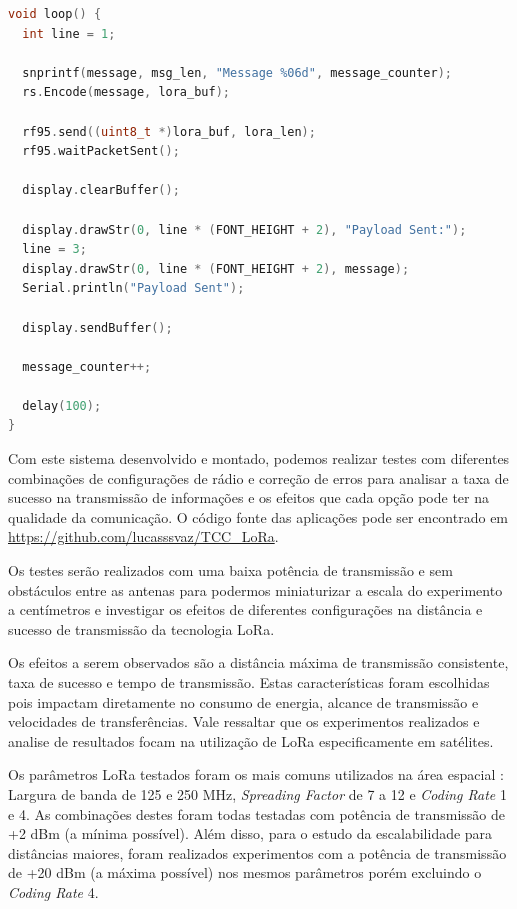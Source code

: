 \documentclass[
	12pt,				%
	openright,			%
	twoside,			%
	a4paper,			%
	english,			%
	french,				%
	spanish,			%
	brazil				%
	]{abntex2}
\begin{document}
\begin{lstlisting}[language=C++, caption=Construção e codificação do pacote a ser transmitido, label=src-loop]
void loop() {
  int line = 1;

  snprintf(message, msg_len, "Message %06d", message_counter);
  rs.Encode(message, lora_buf); 

  rf95.send((uint8_t *)lora_buf, lora_len);
  rf95.waitPacketSent();

  display.clearBuffer();

  display.drawStr(0, line * (FONT_HEIGHT + 2), "Payload Sent:");
  line = 3;
  display.drawStr(0, line * (FONT_HEIGHT + 2), message);
  Serial.println("Payload Sent");

  display.sendBuffer();

  message_counter++;
  
  delay(100);
}

\end{lstlisting}

Com este sistema desenvolvido e montado, podemos realizar testes com diferentes combinações de configurações de rádio e correção de erros para analisar a taxa de sucesso na transmissão de informações e os efeitos que cada opção pode ter na qualidade da comunicação. O código fonte das aplicações pode ser encontrado em \url{https://github.com/lucasssvaz/TCC_LoRa}.

Os testes serão realizados com uma baixa potência de transmissão e sem obstáculos entre as antenas para podermos miniaturizar a escala do experimento a centímetros e investigar os efeitos de diferentes configurações na distância e sucesso de transmissão da tecnologia LoRa.

Os efeitos a serem observados são a distância máxima de transmissão consistente, taxa de sucesso e tempo de transmissão. Estas características foram escolhidas pois impactam diretamente no consumo de energia, alcance de transmissão e velocidades de transferências. Vale ressaltar que os experimentos realizados e analise de resultados focam na utilização de LoRa especificamente em satélites.

Os parâmetros LoRa testados foram os mais comuns utilizados na área espacial \cite{tinygs_2022}: Largura de banda de 125 e 250 MHz, \emph{Spreading Factor} de 7 a 12 e \emph{Coding Rate} 1 e 4. As combinações destes foram todas testadas com potência de transmissão de +2 dBm (a mínima possível). Além disso, para o estudo da escalabilidade para distâncias maiores, foram realizados experimentos com a potência de transmissão de +20 dBm (a máxima possível) nos mesmos parâmetros porém excluindo o \emph{Coding Rate} 4.
\end{document}
